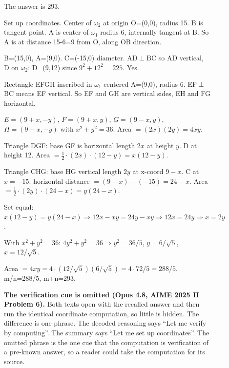 \begin{figure}[H]
\begin{reasoncol}[equal height group=sfC]
\end{reasoncol}\hspace{\columnsep}%
\begin{reasoncol}[equal height group=sfC]
  \caret{}\par\vspace{4pt}
  \raggedright
  The answer is 293.\par\vspace{2pt}
  \par\vspace{2pt}
  Set up coordinates. Center of \(\omega_2\) at origin O=(0,0), radius 15. B is tangent point. A is center of \(\omega_1\) radius 6, internally tangent at B. So A is at distance 15-6=9 from O, along OB direction.\par
  B=(15,0), A=(9,0). C=(-15,0) diameter. AD\(\perp\)BC so AD vertical, D on \(\omega_2\): D=(9,12) since \(9^2+12^2=225\). Yes.\par\vspace{2pt}
  Rectangle EFGH inscribed in \(\omega_1\) centered A=(9,0), radius 6. EF\(\perp\)BC means EF vertical. So EF and GH are vertical sides, EH and FG horizontal.\par
  \(E=(9+x,-y)\), \(F=(9+x,y)\), \(G=(9-x,y)\), \(H=(9-x,-y)\) with \(x^2+y^2=36\). Area \(=(2x)(2y)=4xy\).\par\vspace{2pt}
  Triangle DGF: base GF is horizontal length \(2x\) at height \(y\). D at height 12. Area \(=\tfrac12\cdot(2x)\cdot(12-y)=x(12-y)\).\par
  Triangle CHG: base HG vertical length \(2y\) at x-coord \(9-x\). C at \(x=-15\). horizontal distance \(=(9-x)-(-15)=24-x\). Area \(=\tfrac12\cdot(2y)\cdot(24-x)=y(24-x)\).\par
  Set equal: \(x(12-y)=y(24-x) \Rightarrow 12x-xy=24y-xy \Rightarrow 12x=24y \Rightarrow x=2y\).\par
  With \(x^2+y^2=36\): \(4y^2+y^2=36 \Rightarrow y^2=36/5\), \(y=6/\sqrt5\), \(x=12/\sqrt5\).\par
  Area \(=4xy=4\cdot(12/\sqrt5)(6/\sqrt5)=4\cdot72/5=288/5\). m/n=288/5, m+n=293.
\end{reasoncol}
\caption{\textbf{The verification cue is omitted (Opus 4.8, AIME 2025 II
Problem 6).} Both texts open with the recalled answer and
then run the identical coordinate computation, so little is hidden. The
difference is one phrase. The decoded reasoning says ``Let me verify by
computing''. The summary says ``Let me set up coordinates''. The omitted
phrase is the one cue that the computation is verification of a pre-known answer, so a reader could take the computation for its source.}
\label{fig:sf_verify_cue}
\end{figure}

